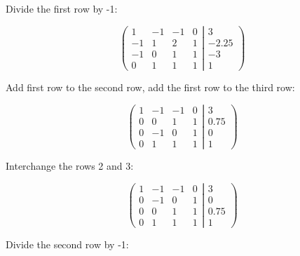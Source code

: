 \documentclass{article}
\begin{document}
Divide the first row by -1:

\begin{equation*}
\left(
  \begin{matrix}
  1 & -1 & -1 & 0 \\
  -1 & 1 & 2 & 1 \\
  -1 & 0 & 1 & 1 \\
  0 & 1 & 1 & 1
  \end{matrix}
  \right.\left|\left.
  \begin{matrix}
  3 \\ -2.25 \\ -3 \\ 1 
  \end{matrix}
  \right)\right.
\end{equation*}

Add first row to the second row, add the first row to the third row:

\begin{equation*}
\left(
  \begin{matrix}
  1 & -1 & -1 & 0 \\
  0 & 0 & 1 & 1 \\
  0 & -1 & 0 & 1 \\
  0 & 1 & 1 & 1
  \end{matrix}
  \right.\left|\left.
  \begin{matrix}
  3 \\ 0.75 \\ 0 \\ 1 
  \end{matrix}
  \right)\right.
\end{equation*}

Interchange the rows 2 and 3:

\begin{equation*}
\left(
  \begin{matrix}
  1 & -1 & -1 & 0 \\
  0 & -1 & 0 & 1 \\
  0 & 0 & 1 & 1 \\
  0 & 1 & 1 & 1
  \end{matrix}
  \right.\left|\left.
  \begin{matrix}
  3 \\ 0 \\ 0.75 \\ 1 
  \end{matrix}
  \right)\right.
\end{equation*}

Divide the second row by -1:
\end{document}
